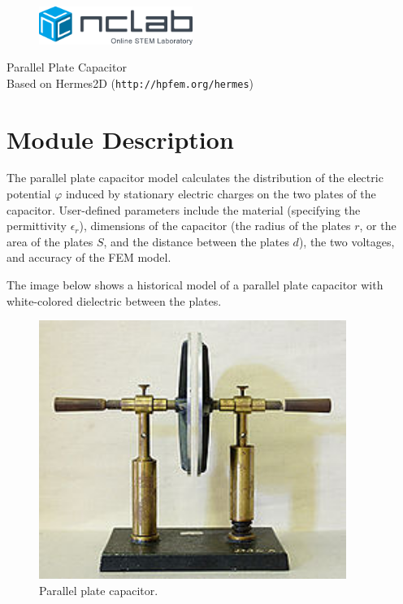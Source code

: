 \documentclass{article}
\begin{document}
\large

\vbox{}
\vspace{-2cm}
\begin{figure}[!ht]
\includegraphics[width=5cm]{img/logo.png}
\vspace{4mm}
\end{figure}
\noindent
\begin{center}
{\Huge Parallel Plate Capacitor}\\[2mm]
Based on Hermes2D ({\tt http://hpfem.org/hermes})\\[6mm]
\end{center}
\section{Module Description}

The parallel plate capacitor model calculates the distribution of the electric 
potential $\varphi$ induced by stationary electric charges on the two plates of the capacitor.
User-defined parameters include the material (specifying the permittivity $\epsilon_r$), dimensions of the capacitor (the radius of the plates $r$, or the area of the plates $S$, 
and the distance between the plates $d$), the two voltages, and accuracy of the FEM model.

The image below shows a historical model of a parallel plate capacitor with white-colored 
dielectric between the plates.
 

\begin{figure}[!ht]
\begin{center}
\includegraphics[width=10cm]{img/capacitor.png}
\caption{Parallel plate capacitor.}
\vspace{4mm}
\end{center}
\end{figure}
\noindent
\end{document}
